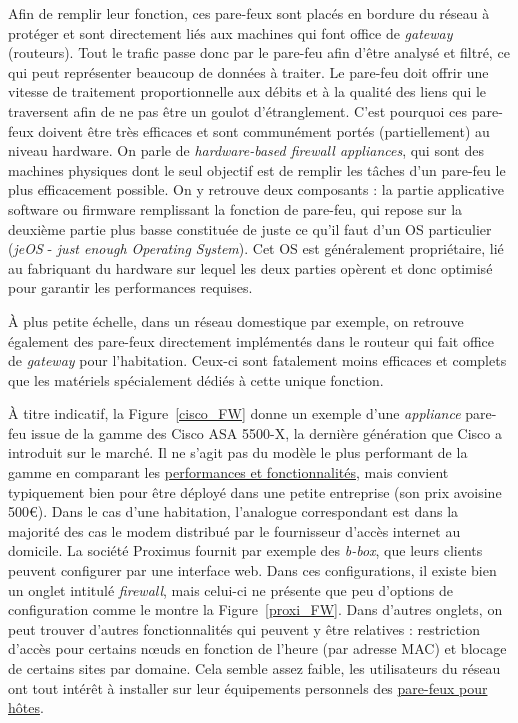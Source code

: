 \documentclass[]{article}
\newcommand{\minit}[1]{\noindent{\small\textbf{ \underline{#1}}}\vspace{0.2cm}}
\begin{document}
\minit{Les pare-feux niveau réseau}\label{netw_fw}

\par Afin de remplir leur fonction, ces pare-feux sont placés en bordure du réseau à protéger et sont  directement liés aux machines qui font office de \textit{gateway} (routeurs). Tout le trafic passe donc par le pare-feu afin d'être analysé et filtré, ce qui peut représenter beaucoup de données à traiter. Le pare-feu doit offrir une vitesse de traitement proportionnelle aux débits et à la qualité des liens qui le traversent afin de ne pas être un goulot d'étranglement. C'est pourquoi ces pare-feux doivent être très efficaces et sont communément portés (partiellement) au niveau hardware. On parle de \textit{hardware-based firewall appliances}, qui sont des machines physiques dont le seul objectif est de remplir les tâches d'un pare-feu le plus efficacement possible. On y retrouve deux composants : la partie applicative software ou firmware remplissant la fonction de pare-feu, qui repose sur la deuxième partie plus basse constituée de juste ce qu'il faut d'un OS particulier (\textit{jeOS} - \textit{just enough Operating System}). Cet OS est généralement propriétaire, lié au fabriquant du hardware sur lequel les deux parties opèrent et donc optimisé pour garantir les performances requises.\\

\par À plus petite échelle, dans un réseau domestique par exemple, on retrouve également des pare-feux directement implémentés dans le routeur qui fait office de \textit{gateway} pour l'habitation. Ceux-ci sont fatalement moins efficaces et complets que les matériels spécialement dédiés à cette unique fonction.\\

\par À titre indicatif, la Figure~\ref{cisco_FW} donne un exemple d'une \textit{appliance} pare-feu issue de la gamme des Cisco ASA 5500-X, la dernière génération que Cisco a introduit sur le marché. Il ne s'agit pas du modèle le plus performant de la gamme en comparant les \href{https://www.cisco.com/c/en/us/products/collateral/security/asa-5500-series-next-generation-firewalls/datasheet-c78-733916.html}{performances et fonctionnalités}, mais convient typiquement bien pour être déployé dans une petite entreprise (son prix avoisine 500\euro). Dans le cas d'une habitation, l'analogue correspondant est dans la majorité des cas le modem distribué par le fournisseur d'accès internet au domicile. La société Proximus fournit par exemple des \textit{b-box}, que leurs clients peuvent configurer par une interface web. Dans ces configurations, il existe bien un onglet intitulé \textit{firewall}, mais celui-ci ne présente que peu d'options de configuration comme le montre la Figure~\ref{proxi_FW}. Dans d'autres onglets, on peut trouver d'autres fonctionnalités qui peuvent y être relatives : restriction d'accès pour certains nœuds en fonction de l'heure (par adresse MAC) et blocage de certains sites par domaine. Cela semble assez faible, les utilisateurs du réseau ont tout intérêt à installer sur leur équipements personnels des \hyperref[host_fw]{pare-feux pour hôtes}.
\end{document}
